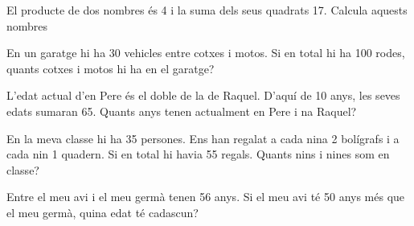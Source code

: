 \begin{activitats}
\begin{mylist}
\exer  El producte de dos nombres és 4 i la suma dels seus quadrats 17. Calcula aquests nombres


\exer  En un garatge hi ha 30 vehicles entre cotxes i motos. Si en total hi ha 100 rodes, quants cotxes i motos hi ha en el garatge?

\exer  L'edat actual d'en Pere és el doble de la de Raquel. D'aquí de 10 anys, les seves edats sumaran 65. Quants anys tenen actualment en Pere i na Raquel?

\exer  En la meva classe hi ha 35 persones. Ens han regalat a cada nina 2 bolígrafs i a cada nin 1 quadern. Si en total hi havia 55 regals. Quants nins i nines som en classe?

\exer  Entre el meu avi i el meu germà tenen 56 anys. Si el meu avi té 50 anys més que el meu germà, quina edat té cadascun?


\end{mylist}
\end{activitats}
